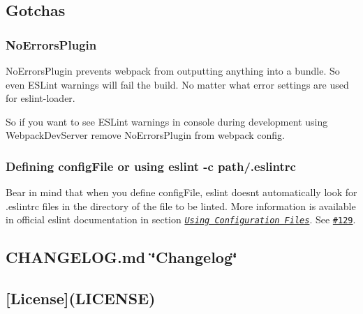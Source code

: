 \subsection*{Gotchas}

\subsubsection*{No\+Errors\+Plugin}

{\ttfamily No\+Errors\+Plugin} prevents webpack from outputting anything into a bundle. So even E\+S\+Lint warnings will fail the build. No matter what error settings are used for {\ttfamily eslint-\/loader}.

So if you want to see E\+S\+Lint warnings in console during development using {\ttfamily Webpack\+Dev\+Server} remove {\ttfamily No\+Errors\+Plugin} from webpack config.

\subsubsection*{Defining {\ttfamily config\+File} or using {\ttfamily eslint -\/c path/.eslintrc}}

Bear in mind that when you define {\ttfamily config\+File}, {\ttfamily eslint} doesn\textquotesingle{}t automatically look for {\ttfamily .eslintrc} files in the directory of the file to be linted. More information is available in official eslint documentation in section \href{http://eslint.org/docs/user-guide/configuring#using-configuration-files}{\tt {\itshape Using Configuration Files}}. See \href{https://github.com/MoOx/eslint-loader/issues/129}{\tt \#129}. 



\subsection*{C\+H\+A\+N\+G\+E\+L\+O\+G.\+md \char`\"{}\+Changelog\char`\"{}}

\subsection*{\mbox{[}License\mbox{]}(L\+I\+C\+E\+N\+SE)}